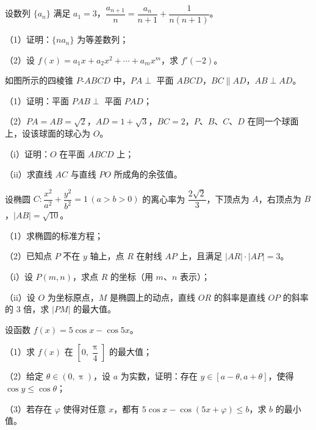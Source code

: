 \documentclass{exam-zh}
\begin{document}
\begin{problem}[points = 15]
设数列 $\{a_{n}\}$ 满足 $a_{1}=3$，$\dfrac{a_{n+1}}{n}=\dfrac{a_{n}}{n+1}+\dfrac{1}{n(n+1)}$。

（1）证明：$\{na_{n}\}$ 为等差数列；

（2）设 $f(x)=a_{1}x+a_{2}x^{2}+\cdots+a_{m}x^{m}$，求 $f'(-2)$。
\end{problem}

\begin{problem}[points = 15]
如图所示的四棱锥 $P\text{-}ABCD$ 中，$PA\perp$ 平面 $ABCD$，$BC\parallel AD$，$AB\perp AD$。

\begin{center}
\end{center}

（1）证明：平面 $PAB\perp$ 平面 $PAD$；

（2）$PA=AB=\sqrt{2}$，$AD=1+\sqrt{3}$，$BC=2$，$P$、$B$、$C$、$D$ 在同一个球面上，设该球面的球心为 $O$。

\qquad（i）证明：$O$ 在平面 $ABCD$ 上；

\qquad（ii）求直线 $AC$ 与直线 $PO$ 所成角的余弦值。
\end{problem}

\begin{problem}[points = 17]
设椭圆 $C\colon \dfrac{x^{2}}{a^{2}}+\dfrac{y^{2}}{b^{2}}=1\,(a>b>0)$ 的离心率为 $\dfrac{2\sqrt{2}}{3}$，下顶点为 $A$，右顶点为 $B$，$|AB|=\sqrt{10}$。

（1）求椭圆的标准方程；

（2）已知点 $P$ 不在 $y$ 轴上，点 $R$ 在射线 $AP$ 上，且满足 $|AR|\cdot|AP|=3$。

\qquad（i）设 $P(m,n)$，求点 $R$ 的坐标（用 $m$、$n$ 表示）；

\qquad（ii）设 $O$ 为坐标原点，$M$ 是椭圆上的动点，直线 $OR$ 的斜率是直线 $OP$ 的斜率的 $3$ 倍，求 $|PM|$ 的最大值。
\end{problem}

\begin{problem}[points = 17]
设函数 $f(x)=5\cos x-\cos 5x$。

（1）求 $f(x)$ 在 $\left[0,\dfrac{\uppi}{4}\right]$ 的最大值；

（2）给定 $\theta\in(0,\uppi)$，设 $a$ 为实数，证明：存在 $y\in[a-\theta,a+\theta]$，使得 $\cos y\le\cos\theta$；

（3）若存在 $\varphi$ 使得对任意 $x$，都有 $5\cos x-\cos(5x+\varphi)\le b$，求 $b$ 的最小值。
\end{problem}
\end{document}
